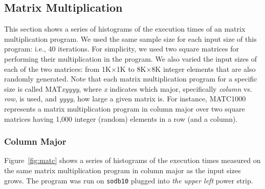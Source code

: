 \documentclass[10pt]{article}
\begin{document}
\clearpage
\pagebreak

\subsection{Matrix Multiplication~\label{sec:mm}} 

This section shows a series of histograms of 
the execution times of an matrix multiplication program. 
We used the same sample size for each input size of this program: i.e., 40 iterations. 
For simplicity, we used two square matrices for performing their multiplication in the program.  
We also varied the input sizes of each of the two matrices: 
from 1K$\times$1K to 8K$\times$8K integer elements that are also randomly generated. 
Note that each matrix multiplication program for a specific size is called MAT{\it xyyyy}, 
where {\it x} indicates which major, specifically {\em column} vs. {\em row}, is used, and {\it yyyy}, how large a given matrix is. 
For instance, MATC1000 represents a matrix multiplication program 
in column major over two square matrices having 1,000 integer (random) 
elements in a row (and a column). 

\pagebreak

\subsubsection{Column Major}

Figure~\ref{fig:matc} shows a series of 
histograms of the execution times measured on 
the same matrix multiplication program in column major 
as the input sizes grows. The program was run on {\tt sodb10} plugged into {\em the upper left} power strip.
\end{document}
